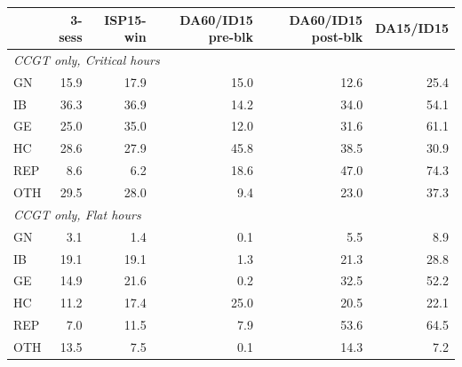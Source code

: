 \begin{tabular}{l r r r r r}
\toprule
 & 3-sess & ISP15-win & DA60/ID15 pre-blk & DA60/ID15 post-blk & DA15/ID15 \\
\midrule
\multicolumn{6}{l}{\textit{CCGT only, Critical hours}} \\
GN & 15.9 & 17.9 & 15.0 & 12.6 & 25.4 \\
IB & 36.3 & 36.9 & 14.2 & 34.0 & 54.1 \\
GE & 25.0 & 35.0 & 12.0 & 31.6 & 61.1 \\
HC & 28.6 & 27.9 & 45.8 & 38.5 & 30.9 \\
REP & 8.6 & 6.2 & 18.6 & 47.0 & 74.3 \\
OTH & 29.5 & 28.0 & 9.4 & 23.0 & 37.3 \\
\midrule
\multicolumn{6}{l}{\textit{CCGT only, Flat hours}} \\
GN & 3.1 & 1.4 & 0.1 & 5.5 & 8.9 \\
IB & 19.1 & 19.1 & 1.3 & 21.3 & 28.8 \\
GE & 14.9 & 21.6 & 0.2 & 32.5 & 52.2 \\
HC & 11.2 & 17.4 & 25.0 & 20.5 & 22.1 \\
REP & 7.0 & 11.5 & 7.9 & 53.6 & 64.5 \\
OTH & 13.5 & 7.5 & 0.1 & 14.3 & 7.2 \\
\midrule
\bottomrule
\end{tabular}
